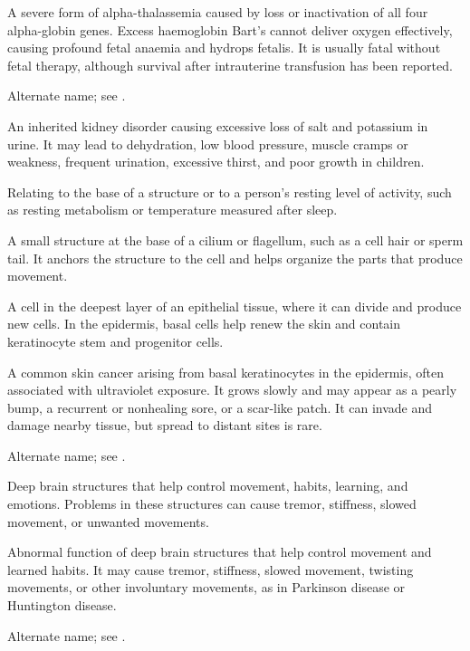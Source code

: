  A severe form of alpha-thalassemia caused
by loss or inactivation of all four alpha-globin genes. Excess haemoglobin
Bart's cannot deliver oxygen effectively, causing profound fetal anaemia and
hydrops fetalis. It is usually fatal without fetal therapy, although survival
after intrauterine transfusion has been reported.

 Alternate name; see .

 An inherited kidney disorder causing excessive loss of salt and potassium in urine. It may lead to dehydration, low blood pressure, muscle cramps or weakness, frequent urination, excessive thirst, and poor growth in children.

 Relating to the base of a structure or to a person's resting level of activity, such as resting metabolism or temperature measured after sleep.

 A small structure at the base of a cilium or flagellum, such as a cell hair or sperm tail. It anchors the structure to the cell and helps organize the parts that produce movement.

 A cell in the deepest layer of an epithelial tissue, where it can divide and produce new cells. In the epidermis, basal cells help renew the skin and contain keratinocyte stem and progenitor cells.

 A common skin cancer arising from basal keratinocytes in the epidermis, often
associated with ultraviolet exposure. It grows slowly and may appear as a pearly bump, a
recurrent or nonhealing sore, or a scar-like patch. It can invade and damage nearby tissue,
but spread to distant sites is rare.

 Alternate name; see .

 Deep brain structures that help control movement, habits, learning, and emotions. Problems in these structures can cause tremor, stiffness, slowed movement, or unwanted movements.

 Abnormal function of deep brain structures that help control movement and learned habits. It may cause tremor, stiffness, slowed movement, twisting movements, or other involuntary movements, as in Parkinson disease or Huntington disease.

 Alternate name; see .

